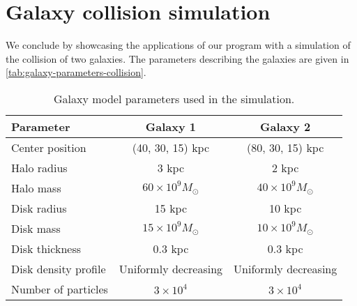 \section{Galaxy collision simulation}
We conclude by showcasing the applications of our program with a simulation of the collision of two galaxies.
The parameters describing the galaxies are given in \autoref{tab:galaxy-parameters-collision}.
\begin{table}[htp]
    \centering
    \begin{tabular}{|l|c|c|}
        \hline
        \textbf{Parameter}   & \textbf{Galaxy 1}        & \textbf{Galaxy 2}        \\
        \hline
        Center position      & (40, 30, 15) kpc         & (80, 30, 15) kpc         \\
        Halo radius          & 3 kpc                    & 2 kpc                    \\
        Halo mass            & $60 \times 10^9 M_\odot$ & $40 \times 10^9 M_\odot$ \\
        Disk radius          & 15 kpc                   & 10 kpc                   \\
        Disk mass            & $15 \times 10^9 M_\odot$ & $10 \times 10^9 M_\odot$ \\
        Disk thickness       & 0.3 kpc                  & 0.3 kpc                  \\
        Disk density profile & Uniformly decreasing     & Uniformly decreasing     \\
        Number of particles  & $3 \times 10^4$          & $3 \times 10^4$          \\
        \hline
    \end{tabular}
    \caption{Galaxy model parameters used in the simulation.}
    \label{tab:galaxy-parameters-collision}
\end{table}
